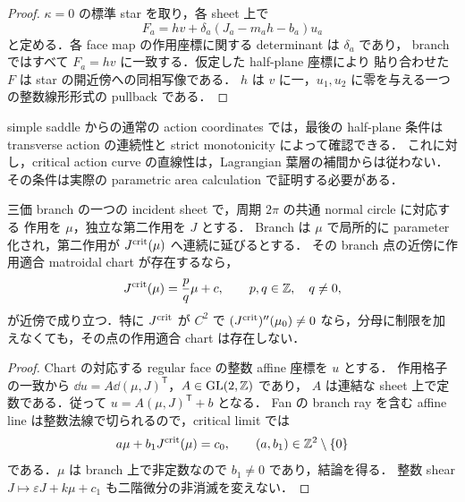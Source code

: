 \begin{proof}
$\kappa=0$ の標準 star を取り，各 sheet 上で
\[
 F_a=h v+\delta_a(J_a-m_a h-b_a)u_a
\]
と定める．各 face map の作用座標に関する determinant は $\delta_a$ であり，
branch ではすべて $F_a=hv$ に一致する．仮定した half-plane 座標により
貼り合わせた $F$ は star の開近傍への同相写像である．
$h$ は $v$ に一，$u_1,u_2$ に零を与える一つの整数線形形式の pullback である．
\end{proof}

simple saddle からの通常の action coordinates では，最後の half-plane 条件は
transverse action の連続性と strict monotonicity によって確認できる．
これに対し，critical action curve の直線性は，Lagrangian 葉層の補間からは従わない．
その条件は実際の parametric area calculation で証明する必要がある．

\begin{proposition}
\label{atl:critical-action-obstruction}
三価 branch の一つの incident sheet で，周期 $2\pi$ の共通 normal circle に対応する
作用を $\mu$，独立な第二作用を $J$ とする．
Branch は $\mu$ で局所的に parameter 化され，第二作用が
$J^{\rm crit}(\mu)$ へ連続に延びるとする．
その branch 点の近傍に作用適合 matroidal chart が存在するなら，
\begin{equation}\label{atl:critical-rational-line}
 J^{\rm crit}(\mu)=\frac{p}{q}\mu+c,
 \qquad p,q\in\mathbb Z,\quad q\ne0,
\end{equation}
が近傍で成り立つ．特に $J^{\rm crit}$ が $C^2$ で
$(J^{\rm crit})''(\mu_0)\ne0$ なら，分母に制限を加えなくても，その点の作用適合 chart は存在しない．
\end{proposition}

\begin{proof}
Chart の対応する regular face の整数 affine 座標を $u$ とする．
作用格子の一致から $\dd u=A\dd(\mu,J)^{\mathsf T}$，$A\in\operatorname{GL}(2,\mathbb Z)$ であり，
$A$ は連結な sheet 上で定数である．従って $u=A(\mu,J)^{\mathsf T}+b$ となる．
Fan の branch ray を含む affine line は整数法線で切られるので，critical limit では
\[
 a\mu+b_1J^{\rm crit}(\mu)=c_0,
 \qquad (a,b_1)\in\mathbb Z^2\setminus\{0\}
\]
である．$\mu$ は branch 上で非定数なので $b_1\ne0$ であり，結論を得る．
整数 shear $J\mapsto\varepsilon J+k\mu+c_1$ も二階微分の非消滅を変えない．
\end{proof}

